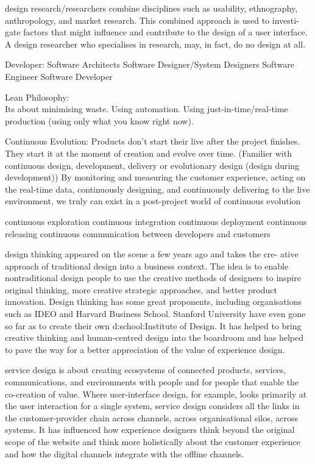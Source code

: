 {design research/researchers combine disciplines such as usability, ethnography, anthropology, and market research. This combined approach is used to investi- gate factors that might influence and contribute to the design of a user interface. A design researcher who specialises in research, may, in fact, do no design at all.

Developer:
Software Architects
Software Designer/System Designers
Software Engineer
Software Developer

Lean Philosophy:\\
Its about minimising waste. Using automation. Using just-in-time/real-time production (using only what you know right now).

Continuous Evolution: 
Products don't start their live after the project finishes.\\
They start it at the moment of creation and evolve over time.
(Familier with continuous design, development, delivery or evolutionary design (design during development))
By monitoring and measuring the customer experience, acting on the real-time data, continuously designing, and continuously delivering to the live environment, we truly can exist in a post-project world of continuous evolution

continuous exploration
continuous integration
continuous deployment
continuous releasing
continuous communication between developers and customers

design thinking appeared on the scene a few years ago and takes the cre- ative approach of traditional design into a business context. The idea is to enable nontraditional design people to use the creative methods of designers to inspire original thinking, more creative strategic approaches, and better product innovation. Design thinking has some great proponents, including organisations such as IDEO and Harvard Business School. Stanford University have even gone so far as to create their own d:school:Institute of Design.
It has helped to bring creative thinking and human-centred design into the boardroom and has helped to pave the way for a better appreciation of the value of experience design.

service design is about creating ecosystems of connected products, services, communications, and environments with people and for people that enable the co-creation of value. Where user-interface design, for example, looks primarily at the user interaction for a single system, service design considers all the links in the customer-provider chain across channels, across organisational silos, across systems. It has influenced how experience designers think beyond the original scope of the website and think more holistically about the customer experience and how the digital channels integrate with the offline channels.

}
